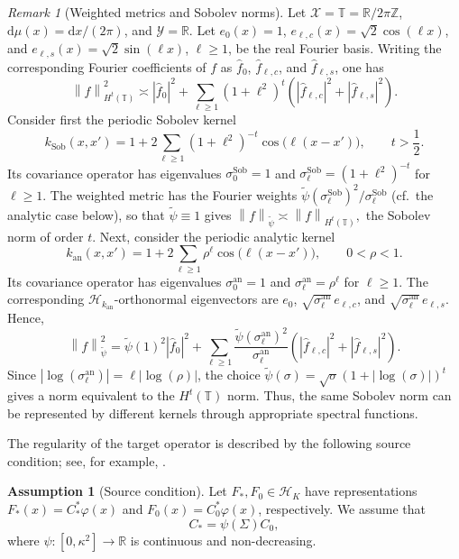 \documentclass[11pt]{article}
\numberwithin{equation}{section}
\theoremstyle{plain}
\theoremstyle{definition}
\newtheorem{assumption}[theorem]{Assumption}
\theoremstyle{remark}
\newtheorem{remark}[theorem]{Remark}
\newcommand{\X}{\mathcal{X}}
\newcommand{\Hs}{\mathcal{H}}
\newcommand{\Y}{\mathcal{Y}}
\newcommand{\norm}[1]{\left\lVert#1\right\rVert}
\newcommand{\tpsi}{\widetilde{\psi}}
\newcommand{\abs}[1]{\left|#1\right|}
\begin{document}
\begin{remark}[Weighted metrics and Sobolev norms]  \label{rem:norms}
Let $\X=\mathbb{T}=\mathbb{R}/2\pi\mathbb{Z}$,
$\mathrm{d}\mu(x)=\mathrm{d}x/(2\pi)$, and  $\Y=\mathbb{R}$. Let
$e_0(x)=1$, $e_{\ell,c}(x)=\sqrt{2}\cos(\ell x)$, and
$e_{\ell,s}(x)=\sqrt{2}\sin(\ell x)$, $\ell\geq1$, be the real Fourier basis.
Writing the corresponding Fourier coefficients of $f$ as
$\widehat f_0$, $\widehat f_{\ell,c}$, and $\widehat f_{\ell,s}$, one has
\[
\norm{f}_{H^t(\mathbb{T})}^2
\asymp
\abs{\widehat f_0}^2+
\sum_{\ell\geq1}(1+\ell^2)^t
\left(
\abs{\widehat f_{\ell,c}}^2+
\abs{\widehat f_{\ell,s}}^2
\right).
\]
Consider first the periodic Sobolev kernel
\[
k_{\mathrm{Sob}}(x,x')
=
1+2\sum_{\ell\geq1}
(1+\ell^2)^{-t}\cos\bigl(\ell(x-x')\bigr),
\qquad t>\frac12.
\]
Its covariance operator has eigenvalues
$\sigma_0^{\mathrm{Sob}}=1$ and
$\sigma_\ell^{\mathrm{Sob}}=(1+\ell^2)^{-t}$ for $\ell\geq1$. The weighted metric has the Fourier weights
$\tpsi(\sigma_\ell^{\mathrm{Sob}})^2/\sigma_\ell^{\mathrm{Sob}}$ (cf.\ the
analytic case below), so that $\tpsi\equiv1$ gives
\(
\norm{f}_{\tpsi}
\asymp
\norm{f}_{H^t(\mathbb{T})},
\)
the Sobolev norm of order $t$. Next, consider the periodic analytic kernel
\[
k_{\mathrm{an}}(x,x')
=
1+2\sum_{\ell\geq1}
\rho^\ell\cos\bigl(\ell(x-x')\bigr),
\qquad 0<\rho<1.
\]
Its covariance operator has eigenvalues
$\sigma_0^{\mathrm{an}}=1$ and
$\sigma_\ell^{\mathrm{an}}=\rho^\ell$ for $\ell\geq1$. The corresponding
$\mathcal{H}_{k_{\mathrm{an}}}$-orthonormal eigenvectors are
$e_0$, $\sqrt{\sigma_\ell^{\mathrm{an}}}\,e_{\ell,c}$, and
$\sqrt{\sigma_\ell^{\mathrm{an}}}\,e_{\ell,s}$. Hence,
\[
\norm{f}_{\tpsi}^2
=
\tpsi(1)^2\abs{\widehat f_0}^2+
\sum_{\ell\geq1}
\frac{\tpsi(\sigma_\ell^{\mathrm{an}})^2}
{\sigma_\ell^{\mathrm{an}}}
\left(
\abs{\widehat f_{\ell,c}}^2+
\abs{\widehat f_{\ell,s}}^2
\right).
\]
Since
$\abs{\log(\sigma_\ell^{\mathrm{an}})}
=\ell\abs{\log(\rho)}$, the choice
$\tpsi(\sigma)=\sqrt{\sigma}(1+\abs{\log(\sigma)})^t$ gives a norm equivalent
to the $H^t(\mathbb{T})$ norm. Thus, the same Sobolev norm can be represented
by different kernels through appropriate spectral functions.
\end{remark}

The regularity of the target operator is described by the following source
condition; see, for example,
\cite{bauer2007regularization,meunier2024optimal}.

\begin{assumption}[Source condition]
\label{as:source_operator}
Let $F_*,F_0\in\Hs_K$ have representations
$F_*(x)=C_*^*\varphi(x)$ and $F_0(x)=C_0^*\varphi(x)$, respectively. We
assume that
\begin{equation}
\label{eq:source_operator}
C_*=\psi(\Sigma)C_0,
\end{equation}
where $\psi\colon[0,\kappa^2]\to\mathbb{R}$ is continuous and non-decreasing.
\end{assumption}
\end{document}
